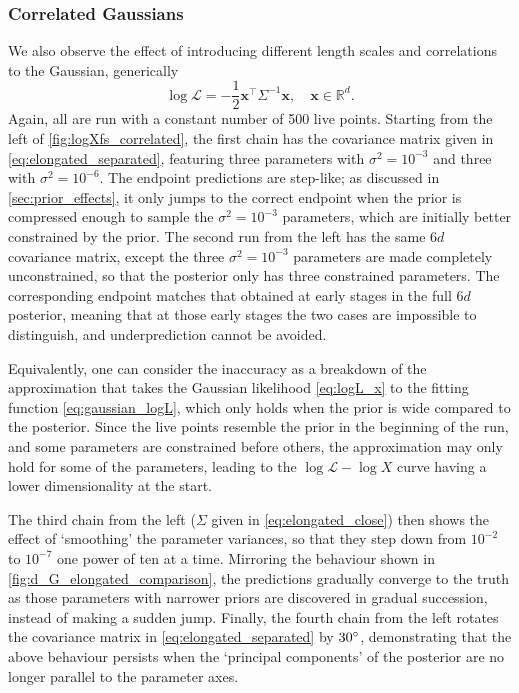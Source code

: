 \documentclass[usenatbib]{mnras}
\newcommand{\Like}{\mathcal{L}}
\begin{document}
\subsubsection{Correlated Gaussians}\label{sec:logXfs_correlated}
We also observe the effect of introducing different length scales and correlations to the Gaussian, generically 
\begin{equation}
    \log\Like = - \frac{1}{2} \bm{x}^{\intercal} \Sigma^{-1} \bm{x}, \quad \bm{x} \in \mathbb{R}^{d}.
\end{equation}
Again, all are run with a constant number of 500 live points. Starting from the left of \cref{fig:logXfs_correlated}, the first chain has the covariance matrix given in \cref{eq:elongated_separated}, featuring three parameters with $\sigma^2 = 10^{-3}$ and three with $\sigma^2=10^{-6}$. The endpoint predictions are step-like; as discussed in \cref{sec:prior_effects}, it only jumps to the correct endpoint when the prior is compressed enough to sample the $\sigma^2=10^{-3}$ parameters, which are initially better constrained by the prior. The second run from the left has the same $6d$ covariance matrix, except the three $\sigma^2=10^{-3}$ parameters are made completely unconstrained, so that the posterior only has three constrained parameters. The corresponding endpoint matches that obtained at early stages in the full $6d$ posterior, meaning that at those early stages the two cases are impossible to distinguish, and underprediction cannot be avoided.
\par
Equivalently, one can consider the inaccuracy as a breakdown of the approximation that takes the Gaussian likelihood \cref{eq:logL_x} to the fitting function \cref{eq:gaussian_logL}, which only holds when the prior is wide compared to the posterior. Since the live points resemble the prior in the beginning of the run, and some parameters are constrained before others, the approximation may only hold for some of the parameters, leading to the $\log\Like-\log X$ curve having a lower dimensionality at the start.
\par
The third chain from the left ($\Sigma$ given in \cref{eq:elongated_close}) then shows the effect of `smoothing' the parameter variances, so that they step down from $10^{-2}$ to $10^{-7}$ one power of ten at a time. Mirroring the behaviour shown in \cref{fig:d_G_elongated_comparison}, the predictions gradually converge to the truth as those parameters with narrower priors are discovered in gradual succession, instead of making a sudden jump. Finally, the fourth chain from the left rotates the covariance matrix in \cref{eq:elongated_separated} by $30\degree$, demonstrating that the above behaviour persists when the `principal components' of the posterior are no longer parallel to the parameter axes.
\end{document}
